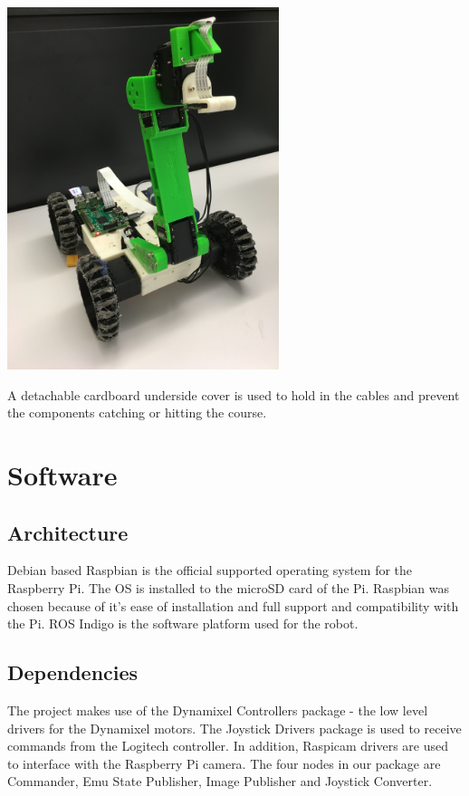 \documentclass[titlepage,12pt,a4paper]{article}
\begin{document}
\begin{center}
    \noindent \includegraphics[height=300pt]{robot}
\end{center}

\noindent A detachable cardboard underside cover is used to hold in the cables and prevent the components catching or hitting the course.

\section{Software}
\subsection{Architecture}
Debian based Raspbian is the official supported operating system for the Raspberry Pi. The OS is installed to the microSD card of the Pi. Raspbian was chosen because of it’s ease of installation and full support and compatibility with the Pi. ROS Indigo is the software platform used for the robot.


\subsection{Dependencies}

\noindent The project makes use of the Dynamixel Controllers package - the low level drivers for the Dynamixel motors. The Joystick Drivers package is used to receive commands from the Logitech controller. In addition, Raspicam drivers are used to interface with the Raspberry Pi camera.
The four nodes in our package are Commander, Emu State Publisher, Image Publisher and Joystick Converter.
\end{document}
